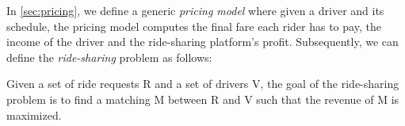 In \cref{sec:pricing}, we define a generic \textit{pricing model} where given a driver and its schedule, the pricing model computes the final fare each rider has to pay, the income of the driver and the ride-sharing platform's profit. Subsequently, we can define the \textit{ride-sharing} problem as follows:

\begin{definition} 
Given a set of ride requests R and a set of drivers V, the goal of the ride-sharing problem is to find a matching M between R and V such that the revenue of M is maximized.
\end{definition}






